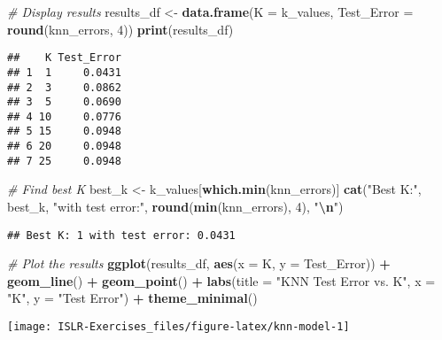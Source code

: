 \documentclass[
]{article}
\newenvironment{Shaded}{\begin{snugshade}}{\end{snugshade}}
\newcommand{\AttributeTok}[1]{\textcolor[rgb]{0.13,0.29,0.53}{#1}}
\newcommand{\CommentTok}[1]{\textcolor[rgb]{0.56,0.35,0.01}{\textit{#1}}}
\newcommand{\DecValTok}[1]{\textcolor[rgb]{0.00,0.00,0.81}{#1}}
\newcommand{\FunctionTok}[1]{\textcolor[rgb]{0.13,0.29,0.53}{\textbf{#1}}}
\newcommand{\NormalTok}[1]{#1}
\newcommand{\OtherTok}[1]{\textcolor[rgb]{0.56,0.35,0.01}{#1}}
\newcommand{\SpecialCharTok}[1]{\textcolor[rgb]{0.81,0.36,0.00}{\textbf{#1}}}
\newcommand{\StringTok}[1]{\textcolor[rgb]{0.31,0.60,0.02}{#1}}
\begin{document}
\begin{Shaded}
\begin{Highlighting}[]
\CommentTok{\# Display results}
\NormalTok{results\_df }\OtherTok{\textless{}{-}} \FunctionTok{data.frame}\NormalTok{(}\AttributeTok{K =}\NormalTok{ k\_values, }\AttributeTok{Test\_Error =} \FunctionTok{round}\NormalTok{(knn\_errors, }\DecValTok{4}\NormalTok{))}
\FunctionTok{print}\NormalTok{(results\_df)}
\end{Highlighting}
\end{Shaded}

\begin{verbatim}
##    K Test_Error
## 1  1     0.0431
## 2  3     0.0862
## 3  5     0.0690
## 4 10     0.0776
## 5 15     0.0948
## 6 20     0.0948
## 7 25     0.0948
\end{verbatim}

\begin{Shaded}
\begin{Highlighting}[]
\CommentTok{\# Find best K}
\NormalTok{best\_k }\OtherTok{\textless{}{-}}\NormalTok{ k\_values[}\FunctionTok{which.min}\NormalTok{(knn\_errors)]}
\FunctionTok{cat}\NormalTok{(}\StringTok{"Best K:"}\NormalTok{, best\_k, }\StringTok{"with test error:"}\NormalTok{, }\FunctionTok{round}\NormalTok{(}\FunctionTok{min}\NormalTok{(knn\_errors), }\DecValTok{4}\NormalTok{), }\StringTok{"}\SpecialCharTok{\textbackslash{}n}\StringTok{"}\NormalTok{)}
\end{Highlighting}
\end{Shaded}

\begin{verbatim}
## Best K: 1 with test error: 0.0431
\end{verbatim}

\begin{Shaded}
\begin{Highlighting}[]
\CommentTok{\# Plot the results}
\FunctionTok{ggplot}\NormalTok{(results\_df, }\FunctionTok{aes}\NormalTok{(}\AttributeTok{x =}\NormalTok{ K, }\AttributeTok{y =}\NormalTok{ Test\_Error)) }\SpecialCharTok{+}
  \FunctionTok{geom\_line}\NormalTok{() }\SpecialCharTok{+}
  \FunctionTok{geom\_point}\NormalTok{() }\SpecialCharTok{+}
  \FunctionTok{labs}\NormalTok{(}\AttributeTok{title =} \StringTok{"KNN Test Error vs. K"}\NormalTok{, }\AttributeTok{x =} \StringTok{"K"}\NormalTok{, }\AttributeTok{y =} \StringTok{"Test Error"}\NormalTok{) }\SpecialCharTok{+}
  \FunctionTok{theme\_minimal}\NormalTok{()}
\end{Highlighting}
\end{Shaded}

\begin{center}\texttt{[image: ISLR-Exercises\_files/figure-latex/knn-model-1]} \end{center}
\end{document}
